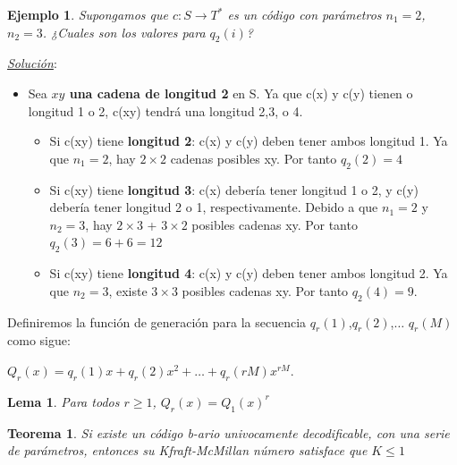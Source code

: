 \documentclass{beamer}
\newtheorem{teorema} [Teorema] {Teorema}
\newtheorem{ejemplo} [Ejemplo] {Ejemplo}
\newtheorem{lema} [theorem] {Lema}
\begin{document}
\begin{frame}      \small
 
 \begin{ejemplo}

Supongamos que $c: S\rightarrow T^{*}$  es un código con parámetros $n_{1}=2$, $n_{2}=3$. ¿Cuales son los valores para $q_{2}(i)$?
\end{ejemplo}
 
\pause
\textit{\underline{Solución}}:\\

\begin{itemize}
\item  Sea \textbf{$xy$ una cadena de longitud 2} en S. Ya que c(x) y c(y) tienen o longitud 1 o 2, c(xy) tendrá una longitud 2,3, o 4.


\begin{itemize}
\item Si c(xy) tiene \textbf{longitud 2}: c(x) y c(y) deben tener ambos longitud 1. Ya que $n_{1}=2$, hay $2\times 2$ cadenas posibles xy. Por tanto $q_{2}(2)=4$

\item Si c(xy) tiene \textbf{longitud 3}: c(x) debería  tener longitud 1 o 2, y  c(y) debería tener longitud 2 o 1, respectivamente. Debido a que $n_{1}=2$ y $n_{2}=3$, hay $2\times 3$ + $3 \times 2$ posibles cadenas xy. Por tanto  $q_{2}(3)=6+6=12$

\item Si c(xy) tiene \textbf{longitud 4}: c(x) y c(y) deben tener ambos longitud 2. Ya que $n_{2}=3$, existe $3	\times 3$ posibles cadenas xy. Por tanto $q_{2}(4)=9$.
\end{itemize}
\end{itemize}





\end{frame}



\begin{frame}      \small

Definiremos la función de generación para la secuencia  $q_{r}(1)$,$q_{r}(2)$,$\ldots$ $q_{r}(M)$ como sigue:

\begin{center}
$Q_{r}(x)=q_{r}(1)x+q_{r}(2)x^{2} +\ldots +q_{r}(rM)x^{rM}.$
\end{center}
 
 
\begin{lema}
Para todos $r\geq 1$, $Q_r(x)=Q_1(x)^r$
\end{lema}

\begin{teorema}\label{UDK1}
Si existe un código b-ario univocamente decodificable, con una serie de parámetros, entonces su Kfraft-McMillan número satisface que  $K \leq 1$
\end{teorema}


\end{frame}
\end{document}
